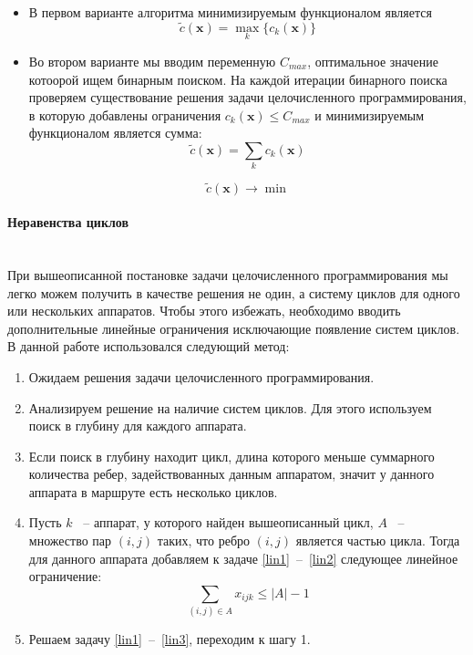 \documentclass[a4paper,14pt,russian]{article}
\begin{document}
\begin{itemize}
\item В первом варианте алгоритма минимизируемым функционалом является
\begin{equation}
\widetilde{c}(\mathbf{x}) = \displaystyle\max_k \{c_k(\mathbf{x})\}
\end{equation}

\item Во втором варианте мы вводим переменную $C_{max}$, оптимальное значение котоорой ищем бинарным поиском. На каждой итерации бинарного поиска проверяем существование решения задачи целочисленного программирования, в которую добавлены ограничения $c_k(\mathbf{x}) \le C_{max}$ и минимизируемым функционалом является сумма:
\begin{equation}
\widetilde{c}(\mathbf{x}) = \displaystyle\sum_k c_k(\mathbf{x})
\end{equation}

\begin{equation} \label{lin2}
\widetilde{c}(\mathbf{x}) \rightarrow \min
\end{equation}

\end{itemize}


\paragraph{Неравенства циклов} ~\\

При вышеописанной постановке задачи целочисленного программирования мы легко можем получить в качестве решения не один, а систему циклов для одного или нескольких аппаратов. Чтобы этого избежать, необходимо вводить дополнительные линейные ограничения исключающие появление систем циклов. В данной работе использовался следующий метод:
\begin{enumerate}
\item  Ожидаем решения задачи целочисленного программирования.
\item Анализируем решение на наличие систем циклов. Для этого используем поиск в глубину для каждого аппарата.
\item Если поиск в глубину находит цикл, длина которого меньше суммарного количества ребер, задействованных данным аппаратом, значит у данного аппарата в маршруте есть несколько циклов.
\item Пусть $k$ ~-- аппарат, у которого найден вышеописанный цикл, $A$ ~-- множество пар $(i, j)$ таких, что ребро $(i, j)$ является частью цикла. Тогда для данного аппарата добавляем к задаче \eqref{lin1}~--~\eqref{lin2} следующее линейное ограничение:
\begin{equation} \label{lin3}
\displaystyle \sum_{(i,j) \in A} x_{i j k} \le |A| - 1
\end{equation}

\item Решаем задачу \eqref{lin1}~--~\eqref{lin3}, переходим к шагу 1.
\end{enumerate}
\end{document}
